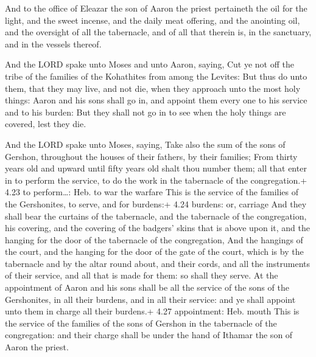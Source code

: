  And to the office of Eleazar the son of Aaron the priest
pertaineth the oil for the light, and the sweet incense, and the daily
meat offering, and the anointing oil, and the oversight of all the
tabernacle, and of all that therein is, in the sanctuary, and in the
vessels thereof.

 And the LORD spake unto Moses and unto Aaron, saying,
 Cut ye not off the tribe of the families of the Kohathites
from among the Levites:  But thus do unto them, that they
may live, and not die, when they approach unto the most holy things:
Aaron and his sons shall go in, and appoint them every one to his
service and to his burden:  But they shall not go in to see
when the holy things are covered, lest they die.

 And the LORD spake unto Moses, saying, 
Take also the sum of the sons of Gershon, throughout the houses of their
fathers, by their families;  From thirty years old and
upward until fifty years old shalt thou number them; all that enter in
to perform the service, to do the work in the tabernacle of the
congregation.+ 4.23 to perform\ldots: Heb. to war the warfare
 This is the service of the families of the Gershonites, to
serve, and for burdens:+ 4.24 burdens: or, carriage  And
they shall bear the curtains of the tabernacle, and the tabernacle of
the congregation, his covering, and the covering of the badgers' skins
that is above upon it, and the hanging for the door of the tabernacle of
the congregation,  And the hangings of the court, and the
hanging for the door of the gate of the court, which is by the
tabernacle and by the altar round about, and their cords, and all the
instruments of their service, and all that is made for them: so shall
they serve.  At the appointment of Aaron and his sons shall
be all the service of the sons of the Gershonites, in all their burdens,
and in all their service: and ye shall appoint unto them in charge all
their burdens.+ 4.27 appointment: Heb. mouth  This is the
service of the families of the sons of Gershon in the tabernacle of the
congregation: and their charge shall be under the hand of Ithamar the
son of Aaron the priest.


